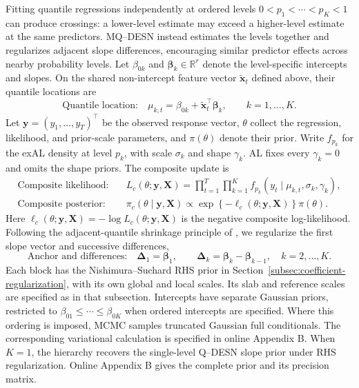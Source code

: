 \documentclass[12pt,letterpaper]{article}
\numberwithin{equation}{section}
\newcommand{\R}{\mathbb{R}}
\newcommand{\vect}[1]{\bm{#1}}
\newcommand{\mat}[1]{\bm{#1}}
\begin{document}
Fitting quantile regressions independently at ordered levels
\(0<p_1<\cdots<p_K<1\) can produce crossings: a lower-level estimate may
exceed a higher-level estimate at the same predictors. MQ--DESN instead
estimates the levels together and regularizes adjacent slope differences,
encouraging similar predictor effects across nearby probability levels.
Let \(\beta_{0k}\) and \(\vect\beta_k\in\R^r\) denote the level-specific
intercepts and slopes. On the shared non-intercept feature vector
\(\tilde{\vect x}_t\) defined above, their quantile locations are
\begin{equation}
\text{Quantile location:}\quad
\mu_{k,t}=\beta_{0k}+\tilde{\vect x}_t^\top\vect\beta_k,
\qquad k=1,\ldots,K.
\label{eq:joint-qdesn-readout}
\end{equation}
Let \(\vect y=(y_1,\ldots,y_T)^\top\) be the observed response vector,
\(\theta\) collect the regression, likelihood, and prior-scale parameters,
and \(\pi(\theta)\) denote their prior. Write \(f_{p_k}\) for the exAL
density at level \(p_k\), with scale \(\sigma_k\) and shape \(\gamma_k\).
AL fixes every \(\gamma_k=0\) and omits the shape priors. The composite
update is
\begin{equation}
\begin{aligned}
\text{Composite likelihood:}\quad
&L_c(\theta;\vect y,\mat X)
 =\prod_{t=1}^T\prod_{k=1}^K
 f_{p_k}(y_t\mid\mu_{k,t},\sigma_k,\gamma_k),\\
\text{Composite posterior:}\quad
&\pi_c(\theta\mid\vect y,\mat X)
 \propto\exp\!\left\{-\ell_c(\theta;\vect y,\mat X)\right\}\pi(\theta).
\end{aligned}
\label{eq:joint-composite-posterior-main}
\end{equation}
Here \(\ell_c(\theta;\vect y,\mat X)=-\log L_c(\theta;\vect y,\mat X)\)
is the negative composite log-likelihood. Following the adjacent-quantile
shrinkage principle of \citet{KohnsSzendrei2025QVP}, we regularize the first
slope vector and successive differences,
\[
\text{Anchor and differences:}\quad
\vect\Delta_1=\vect\beta_1,\qquad
\vect\Delta_k=\vect\beta_k-\vect\beta_{k-1},\quad k=2,\ldots,K.
\]
Each block has the Nishimura--Suchard RHS prior in
Section~\ref{subsec:coefficient-regularization}, with its own global and
local scales. Its slab and reference scales are specified as in that
subsection. Intercepts have separate Gaussian priors, restricted to
\(\beta_{01}\le\cdots\le\beta_{0K}\) when ordered intercepts are specified.
Where this ordering is imposed, MCMC samples truncated Gaussian full
conditionals. The corresponding variational calculation is specified in
online Appendix B.
When \(K=1\), the hierarchy
recovers the single-level Q--DESN slope prior under RHS regularization.
Online Appendix B gives the complete prior and its precision matrix.
\end{document}
